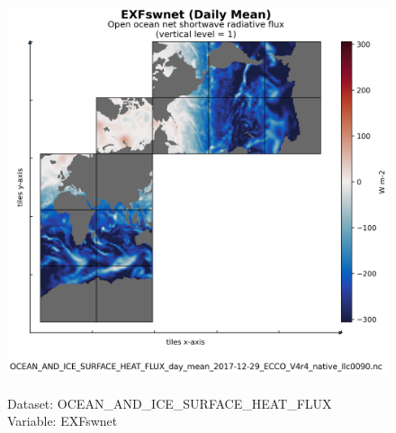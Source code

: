 \begin{figure}[H]
\centering
\includegraphics[scale=0.5]{../images/plots/native_plots/Ocean_and_Sea-Ice_Surface_Heat_Fluxes/EXFswnet.png}
\caption{\\Dataset: OCEAN\_AND\_ICE\_SURFACE\_HEAT\_FLUX\\Variable: EXFswnet}
\label{tab:table-OCEAN_AND_ICE_SURFACE_HEAT_FLUX_EXFswnet-Plot}
\end{figure}
\pagebreak
